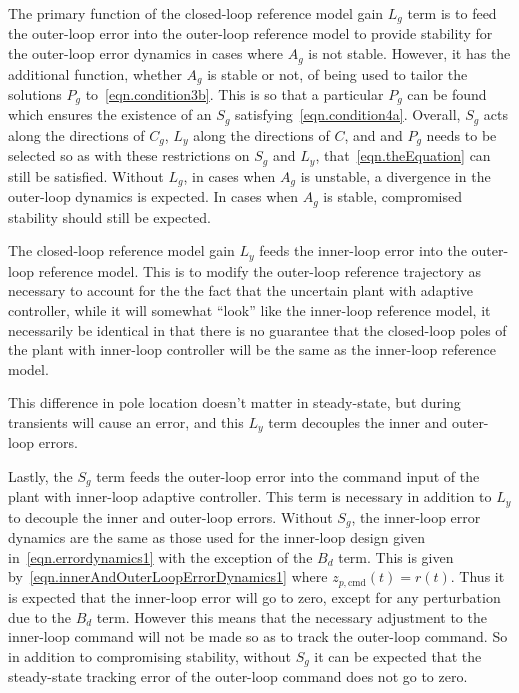 The primary function of the closed-loop reference model gain $L_{g}$ term is to feed the outer-loop error into the outer-loop reference model to provide stability for the outer-loop error dynamics in cases where $A_{g}$ is not stable.
However, it has the additional function, whether $A_{g}$ is stable or not, of being used to tailor the solutions $P_{g}$ to\ \eqref{eqn.condition3b}.
This is so that a particular $P_{g}$ can be found which ensures the existence of an $S_{g}$ satisfying\ \eqref{eqn.condition4a}.
Overall, $S_{g}$ acts along the directions of $C_{g}$, $L_{y}$ along the directions of $C$, and and $P_{g}$ needs to be selected so as with these restrictions on $S_{g}$ and $L_{y}$, that\ \eqref{eqn.theEquation} can still be satisfied.
Without $L_{g}$, in cases when $A_{g}$ is unstable, a divergence in the outer-loop dynamics is expected.
In cases when $A_{g}$ is stable, compromised stability should still be expected.

The closed-loop reference model gain $L_{y}$ feeds the inner-loop error into the outer-loop reference model.
This is to modify the outer-loop reference trajectory as necessary to account for the the fact that the uncertain plant with adaptive controller, while it will somewhat ``look'' like the inner-loop reference model, it necessarily be identical in that there is no guarantee that the closed-loop poles of the plant with inner-loop controller will be the same as the inner-loop reference model.

This difference in pole location doesn't matter in steady-state, but during transients will cause an error, and this $L_{y}$ term decouples the inner and outer-loop errors.

Lastly, the $S_{g}$ term feeds the outer-loop error into the command input of the plant with inner-loop adaptive controller.
This term is necessary in addition to $L_{y}$ to decouple the inner and outer-loop errors.
Without $S_{g}$, the inner-loop error dynamics are the same as those used for the inner-loop design given in\ \eqref{eqn.errordynamics1} with the exception of the $B_{d}$ term.
This is given by\ \eqref{eqn.innerAndOuterLoopErrorDynamics1} where $z_{p,\text{cmd}}(t) = r(t)$.
Thus it is expected that the inner-loop error will go to zero, except for any perturbation due to the $B_{d}$ term.
However this means that the necessary adjustment to the inner-loop command will not be made so as to track the outer-loop command.
So in addition to compromising stability, without $S_{g}$ it can be expected that the steady-state tracking error of the outer-loop command does not go to zero.

